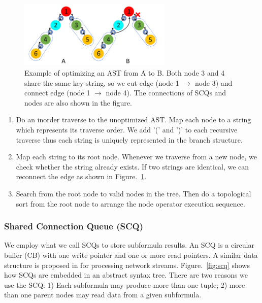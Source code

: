 \begin{figure}
\centering
\includegraphics[width=0.65\textwidth]{../fig/opt_ast.pdf}
\caption{\label{fig:ast}Example of optimizing an AST from A to B. Both node 3 and 4 share the same key string, so we cut edge (node 1 $\rightarrow$ node 3) and connect edge (node 1 $\rightarrow$ node 4). The connections of SCQs and nodes are also shown in the figure.}
\end{figure}

\begin{enumerate}
\item Do an inorder traverse to the unoptimized AST. Map each node to a string which represents its traverse order. We add '(' and ')' to each recursive traverse thus each string is uniquely represented in the branch structure.
\item Map each string to its root node. Whenever we traverse from a new node, we check whether the string already exists. If two strings are identical, we can reconnect the edge as shown in Figure.~\ref{fig:ast}.
\item Search from the root node to valid nodes in the tree. Then do a topological sort from the root node to arrange the node operator execution sequence.
\end{enumerate}


\subsubsection{Shared Connection Queue (SCQ)}
We employ what we call SCQs to store subformula results. An SCQ is a circular buffer (CB) with one write pointer and one or more read pointers. A similar data structure is proposed in \cite{4812537} for processing network streams. Figure.~\ref{fig:scq} shows how SCQs are embedded in an \mltl abstract syntax tree. There are two reasons we use the SCQ: 1) Each subformula may produce more than one tuple; 2) more than one parent nodes may read data from a given subformula.\par

